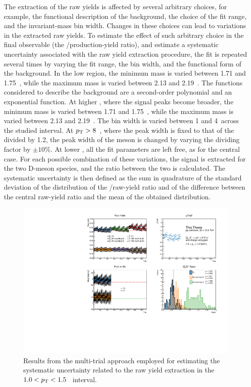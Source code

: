 The extraction of the raw yields is affected by several arbitrary choices, for example, the functional description of the background, the choice of the fit range, and the invariant-mass bin width. Changes in these choices can lead to variations in the extracted raw yields. To estimate the effect of such arbitrary choice in the final observable (the \ds/\dpl production-yield ratio), and estimate a systematic uncertainty associated with the raw yield extraction procedure, the fit is repeated several times by varying the fit range, the bin width, and the functional form of the background. In the low \pt region, the minimum mass is varied between 1.71 and 1.75~\gevcc, while the maximum mass is varied between 2.13 and 2.19~\gevcc. The functions considered to describe the background are a second-order polynomial and an exponential function. At higher \pt, where the signal peaks become broader, the minimum mass is varied between 1.71 and 1.75~\gevcc, while the maximum mass is varied between 2.13 and 2.19~\gevcc. The bin width is varied between 1 and 4~\mevcc across the studied \pt interval. At $p_\mathrm{T}>8$~\gevcc, where the \dpl peak width is fixed to that of the \ds divided by 1.2, the peak width of the \dpl meson is changed by varying the dividing factor by $\pm10\%$. At lower \pt, all the fit parameters are left free, as for the central case. For each possible combination of these variations, the signal is extracted for the two D-meson species, and the ratio between the two is calculated. The systematic uncertainty is then defined as the sum in quadrature of the standard deviation of the distribution of the \ds/\dpl raw-yield ratio and of the difference between the central raw-yield ratio and the mean of the obtained distribution.

\begin{figure}[htb]
    \centering
    \includegraphics[width=\textwidth]{Figures/Chapter 5/RawYieldSyst.pdf}
    \caption{Results from the multi-trial approach employed for estimating the systematic uncertainty related to the raw yield extraction in the \mbox{$1.0<p_\mathrm{T}<1.5$~\gevc} interval.}
    \label{fig:raw_yield_syst}
\end{figure}

